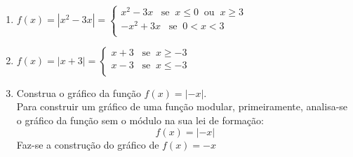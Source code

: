        \begin{enumerate}
            \item ${f(x)=|x^2 -3x| = \left\{  
	           \begin{array}{c}
		              x^2 -3x \;\;\; \text{se} \;\; x \le 0\;\;\text{ou} \;\; x \ge 3\\
		              -x^2 +3x \;\;\; \text{se} \;\; 0 < x < 3 \;\;\;\;\;\;\;\;\;\;\;\;\;\;\\
	           \end{array} 
	           \right.
                  }$
            \item ${f(x)=|x + 3| = \left\{  
	           \begin{array}{c}
		              x + 3 \;\;\; \text{se} \;\; x \ge -3\\
		              x - 3 \;\;\; \text{se} \;\; x \le -3\\
	           \end{array} 
	           \right.
                  }$

        \item Construa o gráfico da função $f(x)=|-x|$. \\

        Para construir um gráfico de uma função modular, primeiramente, analisa-se o gráfico da função sem o módulo na sua lei de formação:
        \[
        f(x)=|-x|
        \]
        Faz-se a construção do gráfico de $f(x)=-x$\\
    \begin{center}
    \end{center}
            

\end{enumerate}
